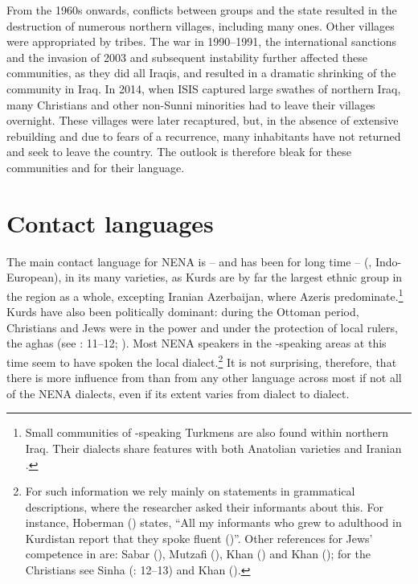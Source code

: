 \documentclass[output=paper]{langsci/langscibook}
\begin{document}
From the 1960s onwards, conflicts between  groups and the  state resulted in the destruction of numerous northern  villages, including many  ones. Other villages were appropriated by  tribes. The war in 1990–1991, the international sanctions and the invasion of 2003 and subsequent instability further affected these communities, as they did all Iraqis, and resulted in a dramatic shrinking of the  community in Iraq. In 2014, when ISIS captured large swathes of northern Iraq, many {Christians} and other non-Sunni minorities had to leave their villages overnight. These villages were later recaptured, but, in the absence of extensive rebuilding and due to fears of a recurrence, many inhabitants have not returned and seek to leave the country. The outlook is therefore bleak for these communities and for their language.

\section{\label{bkm:Ref534214034}Contact languages}

The main contact language for NENA is – and has been for long time –  (, Indo-European), in its many varieties, as {Kurds} are by far the largest ethnic group in the region as a whole, excepting Iranian Azerbaijan, where Azeris predominate.\footnote{Small communities of -speaking Turkmens are also found within northern Iraq. Their dialects share features with both Anatolian  varieties and Iranian  \citep{Bulut2007}.} {Kurds} have also been politically dominant: during the Ottoman period, {Christians} and {Jews} were in the power and under the protection of local  rulers, the aghas (see \citealt{Sinha2000}: 11–12; \citealt[223]{BrauerPatai1993}). Most NENA speakers in the -speaking areas at this time seem to have spoken the local  dialect.\footnote{For such information we rely mainly on statements in grammatical descriptions, where the researcher asked their informants about this. For instance, Hoberman (\citeyear[9]{Hoberman1989}) states, ``All my informants who grew to adulthood in Kurdistan report that they spoke fluent  ()''. Other references for {Jews}’ competence in  are: Sabar (\citeyear[216]{Sabar1978}), Mutzafi (\citeyear[5]{Mutzafi2004}), Khan (\citeyear[198]{Khan2007}) and Khan (\citeyear[11]{Khan2009}); for the {Christians} see Sinha (\citeyear{Sinha2000}: 12–13) and Khan (\citeyear[18]{Khan2008}).} It is not surprising, therefore, that there is more influence from  than from any other language across most if not all of the NENA dialects, even if its extent varies from dialect to dialect.
\end{document}
